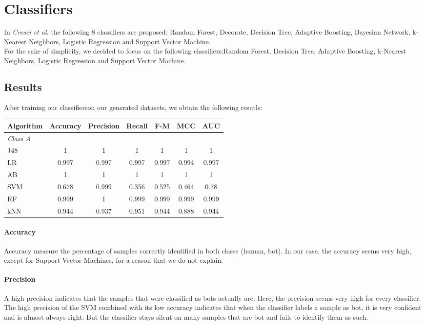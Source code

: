\documentclass[a4paper,11pt]{article}
\begin{document}
\section{Classifiers}
In \textit{Cresci et al.} the following 8 classifiers are proposed: Random Forest, Decorate, Decision Tree, Adaptive Boosting, Bayesian Network, k-Nearest Neighbors, Logistic Regression and Support Vector Machine.\\

For the sake of simplicity, we decided to focus on the following classifiers:Random Forest,  Decision Tree, Adaptive Boosting, k-Nearest Neighbors, Logistic Regression and Support Vector Machine.\\

\subsection{Results}
After training our classifierson our generated datasets, we obtain the following resutls:

\begin{tabular}{lcccccc}
	\hline
	\textbf{Algorithm} 	& \textbf{Accuracy} 	& \textbf{Precision} & \textbf{Recall} &\textbf{F-M} 	& \textbf{MCC} & AUC\\
	\hline
	\textit{Class A}\\
	
	J48	&	1		&	1		&	1		& 1 	&	1	& 1   \\
	LR	&	0.997	&	0.997	&	0.997	& 0.997 &	0.994 & 0.997  \\
	AB	&	1		&	1		&	1		& 1 	&	1	& 1   \\	
	SVM	&	0.678	&	0.999	&	0.356	& 0.525 & 0.464 & 0.78\\
	RF	&	0.999	&	1		&	0.999	& 0.999	&	0.999	& 0.999 \\
	kNN	&	0.944	&	0.937	&	0.951	& 0.944 & 0.888 & 0.944\\
	
	\hline
\end{tabular}
	
	\paragraph{Accuracy}
	Accuracy measure the percentage of samples correctly identified in both classe (human, bot). In our case, the accuracy seems very high, except for Support Vector Machines, for a reason that we do not explain.
	
	\paragraph{Precision}
	A high precision indicates that the samples that were classified as bots actually are. Here, the precision seems very high for every classifier. The high precision of the SVM combined with its low accuracy indicates that when the classifier labels a sample as bot, it is very confident and is almost always right. But the classifier stays silent on many samples that are bot and fails to identify them as such.
	
\end{document}
